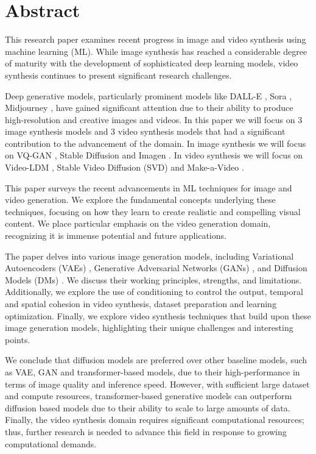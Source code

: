 \section{Abstract}

This research paper examines recent progress in image and video synthesis using machine learning (ML). While image synthesis has reached a considerable degree of maturity with the development of sophisticated deep learning models, video synthesis continues to present significant research challenges.

Deep generative models, particularly prominent models like DALL-E \cite{dalle}, Sora \cite{sora_website}, Midjourney \cite{midjourney-website}, have gained significant attention due to their ability to produce high-resolution and creative images and videos. In this paper we will focus on 3 image synthesis models and 3 video synthesis models that had a significant contribution to the advancement of the domain. In image synthesis we will focus on VQ-GAN \cite{vqgan}, Stable Diffusion \cite{stable_diffusion} and Imagen \cite{imagen}. In video synthesis we will focus on Video-LDM \cite{video_ldm}, Stable Video Diffusion (SVD) \cite{stable_video_diffusion} and Make-a-Video \cite{make_a_video}.

This paper surveys the recent advancements in ML techniques for image and video generation. We explore the fundamental concepts underlying these techniques, focusing on how they learn to create realistic and compelling visual content. We place particular emphasis on the video generation domain, recognizing it is immense potential and future applications.

The paper delves into various image generation models, including Variational Autoencoders (VAEs) \cite{vae}, Generative Adversarial Networks (GANs) \cite{gan}, and Diffusion Models (DMs) \cite{ddpm}. We discuss their working principles, strengths, and limitations. Additionally, we explore the use of conditioning to control the output, temporal and spatial cohesion in video synthesis, dataset preparation and learning optimization. Finally, we explore video synthesis techniques that build upon these image generation models, highlighting their unique challenges and interesting points.

We conclude that diffusion models are preferred over other baseline models, such as VAE, GAN and transformer-based models, due to their high-performance in terms of image quality and inference speed. However, with sufficient large dataset and compute resources, transformer-based generative models can outperform diffusion based models due to their ability to scale to large amounts of data. Finally, the video synthesis domain requires significant computational resources; thus, further research is needed to advance this field in response to growing computational demands.
